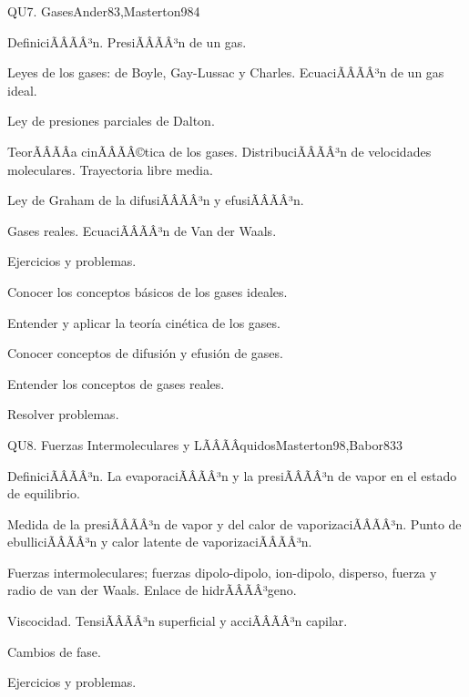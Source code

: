 \begin{sumilla}
\begin{unit}{QU7. Gases}{Ander83,Masterton98}{4}
\begin{topicos}
      \item DefiniciÃÂÃÂ³n. PresiÃÂÃÂ³n de un gas.
      \item Leyes de los gases: de Boyle, Gay-Lussac y Charles. EcuaciÃÂÃÂ³n de un gas ideal.
      \item Ley de presiones parciales de Dalton.
      \item TeorÃÂÃÂ­a cinÃÂÃÂ©tica de los gases. DistribuciÃÂÃÂ³n de velocidades moleculares. Trayectoria libre media.
      \item Ley de Graham de la difusiÃÂÃÂ³n y efusiÃÂÃÂ³n.
      \item Gases reales. EcuaciÃÂÃÂ³n de Van der Waals.
      \item Ejercicios y problemas.
   \end{topicos}

   \begin{objetivos}
      \item Conocer los conceptos b\'asicos de los gases ideales.
      \item Entender y aplicar la teor\'ia cin\'etica de los gases.
      \item Conocer conceptos de difusi\'on y efusi\'on de gases.
      \item Entender los conceptos de gases reales.
      \item Resolver problemas.
   \end{objetivos}
\end{unit}

\begin{unit}{QU8. Fuerzas Intermoleculares y LÃÂÃÂ­quidos}{Masterton98,Babor83}{3}
\begin{topicos}
      \item DefiniciÃÂÃÂ³n. La evaporaciÃÂÃÂ³n y la presiÃÂÃÂ³n de vapor en el estado de equilibrio.
      \item Medida de la presiÃÂÃÂ³n de vapor y del calor de vaporizaciÃÂÃÂ³n. Punto de ebulliciÃÂÃÂ³n y calor latente de vaporizaciÃÂÃÂ³n.
      \item Fuerzas intermoleculares; fuerzas dipolo-dipolo, ion-dipolo, disperso, fuerza y radio de van der Waals. Enlace de hidrÃÂÃÂ³geno.
      \item Viscocidad. TensiÃÂÃÂ³n superficial y acciÃÂÃÂ³n capilar.
      \item Cambios de fase.
      \item Ejercicios y problemas.
    \end{topicos}


\end{unit}
\end{sumilla}
